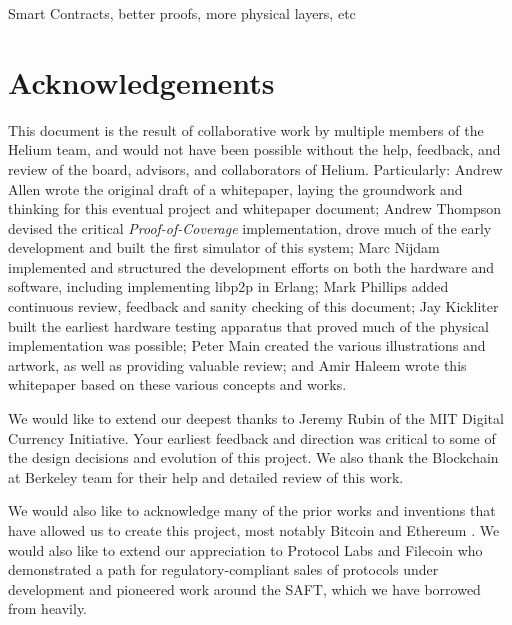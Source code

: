 \documentclass[letterpaper,11pt]{article}
\def\proofofcoverage/{\textit{Proof-of-Coverage}}
\begin{document}
Smart Contracts, better proofs, more physical layers, etc

\newpage

\section{Acknowledgements}

This document is the result of collaborative work by multiple members of the Helium team, and would not have been possible without the help, feedback, and review of the board, advisors, and collaborators of Helium. Particularly: Andrew Allen wrote the original draft of a whitepaper, laying the groundwork and thinking for this eventual project and whitepaper document; Andrew Thompson devised the critical \proofofcoverage/ implementation, drove much of the early development and built the first simulator of this system; Marc Nijdam implemented and structured the development efforts on both the hardware and software, including implementing libp2p in Erlang; Mark Phillips added continuous review, feedback and sanity checking of this document; Jay Kickliter built the earliest hardware testing apparatus that proved much of the physical implementation was possible; Peter Main created the various illustrations and artwork, as well as providing valuable review; and Amir Haleem wrote this whitepaper based on these various concepts and works.\newline

We would like to extend our deepest thanks to Jeremy Rubin of the MIT Digital Currency Initiative. Your earliest feedback and direction was critical to some of the design decisions and evolution of this project. We also thank the Blockchain at Berkeley team for their help and detailed review of this work.\newline

We would also like to acknowledge many of the prior works and inventions that have allowed us to create this project, most notably Bitcoin \cite{bitcoin} and Ethereum \cite{ethereum}. We would also like to extend our appreciation to Protocol Labs \cite{protocol} and Filecoin \cite{filecoin} who demonstrated a path for regulatory-compliant sales of protocols under development and pioneered work around the SAFT, which we have borrowed from heavily.
\newpage
\end{document}
